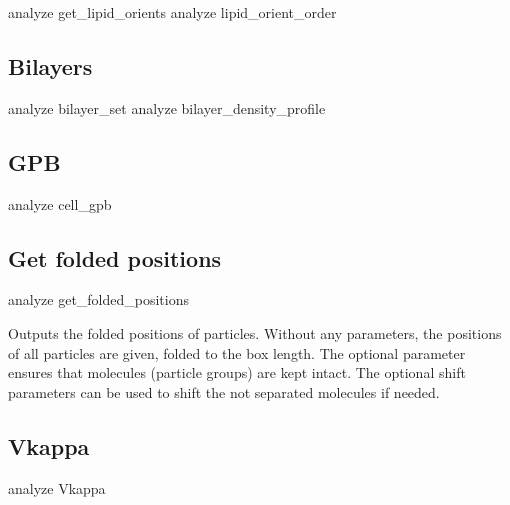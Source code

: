 \begin{essyntax}
   analyze get_lipid_orients
   analyze lipid_orient_order
\end{essyntax}


\subsection{Bilayers}
\label{analyze:bilayers}

\begin{essyntax}
   analyze bilayer_set
   analyze bilayer_density_profile
\end{essyntax}


\subsection{GPB}
\label{analyze:cellgpb}

\begin{essyntax}
  analyze cell_gpb  
   
\end{essyntax}


\subsection{Get folded positions}
\label{analyze:folded}

\begin{essyntax}
  analyze get_folded_positions  
\end{essyntax}

Outputs the folded positions of particles. Without any parameters, the
positions of all particles are given, folded to the box length. The
optional parameter  ensures that molecules
(particle groups) are kept intact. The optional shift parameters can
be used to shift the not separated molecules if needed.

\subsection{Vkappa}
\label{analyze:Vkappa}

\begin{essyntax}
  analyze Vkappa 
\end{essyntax}

